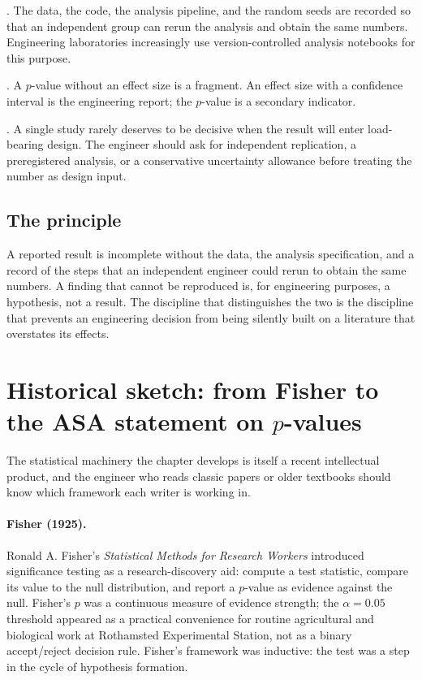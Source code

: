 . The data, the code,
the analysis pipeline, and the random seeds are recorded so that an
independent group can rerun the analysis and obtain the same numbers.
Engineering laboratories increasingly use version-controlled analysis
notebooks for this purpose.

. A $p$-value
without an effect size is a fragment. An effect size with a
confidence interval is the engineering report; the $p$-value is a
secondary indicator.

. A single study
rarely deserves to be decisive when the result will enter
load-bearing design. The engineer should ask for independent
replication, a preregistered analysis, or a conservative uncertainty
allowance before treating the number as design input.

\subsection{The principle}

\begin{principle}
A reported result is incomplete without the data, the analysis
specification, and a record of the steps that an independent
engineer could rerun to obtain the same numbers. A finding that
cannot be reproduced is, for engineering purposes, a hypothesis,
not a result. The discipline that distinguishes the two is the
discipline that prevents an engineering decision from being
silently built on a literature that overstates its effects.
\end{principle}

\section{Historical sketch: from Fisher to the ASA statement on
\texorpdfstring{$p$-values}{p-values}}

The statistical machinery the chapter develops is itself a
recent intellectual product, and the engineer who reads
classic papers or older textbooks should know which framework
each writer is working in.

\paragraph{Fisher (1925).} Ronald A. Fisher's \emph{Statistical
Methods for Research Workers} \cite{hist:fisher1925}
introduced significance testing as a research-discovery aid:
compute a test statistic, compare its value to the null
distribution, and report a $p$-value as evidence against the
null. Fisher's $p$ was a continuous measure of evidence
strength; the $\alpha = 0.05$ threshold appeared as a practical
convenience for routine agricultural and biological work at
Rothamsted Experimental Station, not as a binary
accept/reject decision rule. Fisher's framework was inductive:
the test was a step in the cycle of hypothesis formation.

